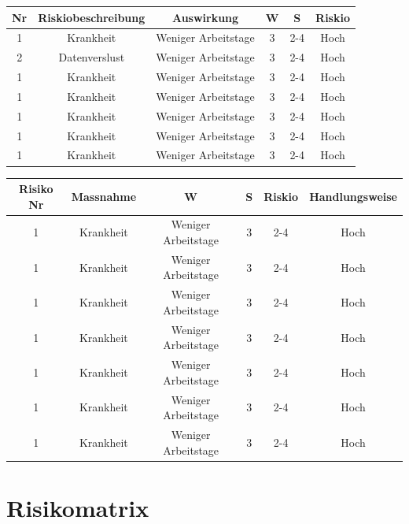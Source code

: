 \documentclass{report}
\begin{document}
\begin{tabular}{ |c|c|c|c|c|c| }
    \hline
    Nr & Riskiobeschreibung & Auswirkung & W & S & Riskio \\
    \hline 
    1 & Krankheit & Weniger Arbeitstage & 3 & 2-4 & \cellcolor{red}Hoch \\
    \hline
    2 & Datenverslust & Weniger Arbeitstage & 3 & 2-4 & \cellcolor{red}Hoch \\
    \hline
    1 & Krankheit & Weniger Arbeitstage & 3 & 2-4 & \cellcolor{red}Hoch \\
    \hline
    1 & Krankheit & Weniger Arbeitstage & 3 & 2-4 & \cellcolor{red}Hoch \\
    \hline
    1 & Krankheit & Weniger Arbeitstage & 3 & 2-4 & \cellcolor{red}Hoch \\
    \hline
    1 & Krankheit & Weniger Arbeitstage & 3 & 2-4 & \cellcolor{red}Hoch \\
    \hline
    1 & Krankheit & Weniger Arbeitstage & 3 & 2-4 & \cellcolor{red}Hoch \\
    \hline
\end{tabular}
\newline
\bigbreak
\begin{flushleft}
\begin{tabular}{ |c|c|c|c|c|c| }
    \hline
    Risiko Nr & Massnahme &  W & S & Riskio & Handlungsweise \\
    \hline 
    1 & Krankheit & Weniger Arbeitstage & 3 & 2-4 & \cellcolor{red}Hoch \\
    \hline
    1 & Krankheit & Weniger Arbeitstage & 3 & 2-4 & \cellcolor{red}Hoch \\
    \hline
    1 & Krankheit & Weniger Arbeitstage & 3 & 2-4 & \cellcolor{red}Hoch \\
    \hline
    1 & Krankheit & Weniger Arbeitstage & 3 & 2-4 & \cellcolor{red}Hoch \\
    \hline
    1 & Krankheit & Weniger Arbeitstage & 3 & 2-4 & \cellcolor{red}Hoch \\
    \hline
    1 & Krankheit & Weniger Arbeitstage & 3 & 2-4 & \cellcolor{red}Hoch \\
    \hline
    1 & Krankheit & Weniger Arbeitstage & 3 & 2-4 & \cellcolor{red}Hoch \\
    \hline
\end{tabular}
    
\end{flushleft}
\section{Risikomatrix}
\end{document}
